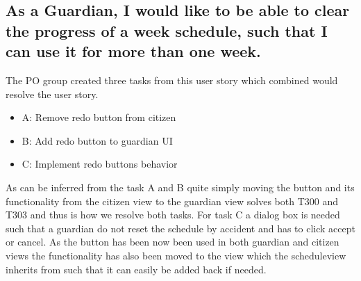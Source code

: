 \subsection{As a Guardian, I would like to be able to clear the progress of a week schedule, such
that I can use it for more than one week.}
The PO group created three tasks from this user story which combined would resolve the user story.
\begin{itemize}
    \item A: Remove redo button from citizen
    \item B: Add redo button to guardian UI
    \item C: Implement redo buttons behavior
\end{itemize}
As can be inferred from the task A and B quite simply moving the button and its functionality from the citizen view to the guardian view solves both T300 and T303 and thus is how we resolve both tasks.
For task C a dialog box is needed such that a guardian do not reset the schedule by accident and has to click accept or cancel.
As the button has been now been used in both guardian and citizen views the functionality has also been moved to the view which the scheduleview inherits from such that it can easily be added back if needed.